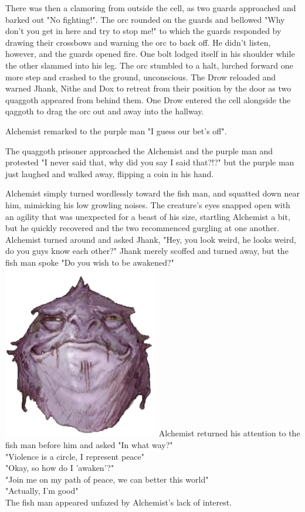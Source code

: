 \documentclass[letterpaper,10pt,twoside,twocolumn,openany]{book}
\begin{document}
There was then a clamoring from outside the cell, as two guards approached and barked out "No fighting!". The orc rounded on the guards and bellowed "Why don't you get in here and try to stop me!" to which the guards responded by drawing their crossbows and warning the orc to back off. He didn't listen, however, and the guards opened fire. One bolt lodged itself in his shoulder while the other slammed into his leg. The orc stumbled to a halt, lurched forward one more step and crashed to the	 ground, unconscious. The Drow reloaded and warned Jhank, Nithe and Dox to retreat from their position by the door as two quaggoth appeared from behind them. One Drow entered the cell alongside the qaggoth to drag the orc out and away into the hallway.

Alchemist remarked to the purple man "I guess our bet's off".

The quaggoth prisoner approached the Alchemist and the purple man and protested "I never said that, why did you say I said that?!?" but the purple man just laughed and walked away, flipping a coin in his hand.

Alchemist simply turned wordlessly toward the fish man, and squatted down near him, mimicking his low growling noises. The creature's eyes snapped open with an agility that was unexpected for a beast of his size, startling Alchemist a bit, but he quickly recovered and the two recommenced gurgling at one another. Alchemist turned around and asked Jhank, "Hey, you look weird, he looks weird, do you guys know each other?" Jhank merely scoffed and turned away, but the fish man spoke "Do you wish to be awakened?"\\
	{\centering
	\includegraphics[width=0.5\linewidth]{img/dist/fish_man.png}
	}
Alchemist returned his attention to the fish man before him and asked "In what way?"\\
"Violence is a circle, I represent peace"\\
"Okay, so how do I 'awaken'?"\\
"Join me on my path of peace, we can better this world"\\
"Actually, I'm good"\\
The fish man appeared unfazed by Alchemist's lack of interest.
\end{document}
